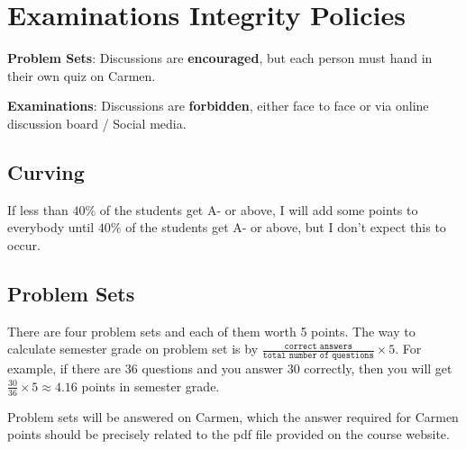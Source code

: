 \documentclass[12pt]{article}
\begin{document}
\section*{Examinations Integrity Policies}

\textbf{Problem Sets}: Discussions are \textbf{encouraged}, but each person must hand in their own quiz on Carmen.

\textbf{Examinations}: Discussions are \textbf{forbidden}, either face to face or via online discussion board / Social media.



\subsection*{Curving}

If less than $40\%$ of the students get A- or above, I will add some points to everybody until $40\%$ of the students get A- or above, but I don’t expect this to occur.

\subsection*{Problem Sets}
\label{sub:Problem_Sets}

There are four problem sets and each of them worth 5 points.
The way to calculate semester grade on problem set is by $ \frac{ \texttt{correct answers} }{ \texttt{total number of questions} } \times 5 $.
For example, if there are 36 questions and you answer 30 correctly, then you will get $ \frac{30}{36} \times 5 \approx 4.16$ points in semester grade.


Problem sets will be answered on Carmen, which the answer required for Carmen points should be precisely related to the pdf file provided on the course website.
\end{document}
